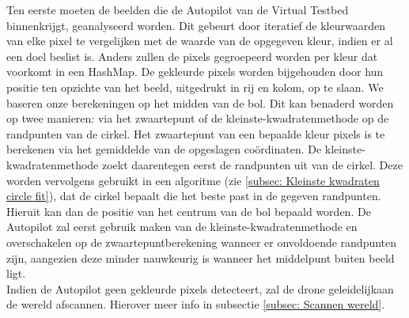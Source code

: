 \noindent
Ten eerste moeten de beelden die de Autopilot van de Virtual Testbed binnenkrijgt, geanalyseerd worden. Dit gebeurt door iteratief de kleurwaarden van elke pixel te vergelijken met de waarde van de opgegeven kleur, indien er al een doel beslist is. Anders zullen de pixels gegroepeerd worden per kleur dat voorkomt in een HashMap. De gekleurde pixels worden bijgehouden door hun positie ten opzichte van het beeld, uitgedrukt in rij en kolom, op te slaan. We baseren onze berekeningen op het midden van de bol. Dit kan benaderd worden op twee manieren: via het zwaartepunt of de kleinste-kwadratenmethode op de randpunten van de cirkel. Het zwaartepunt van een bepaalde kleur pixels is te berekenen via het gemiddelde van de opgeslagen co\"ordinaten. De kleinste-kwadratenmethode zoekt daarentegen eerst de randpunten uit van de cirkel. Deze worden vervolgens gebruikt in een algoritme (zie \ref{subsec: Kleinste kwadraten circle fit}), dat de cirkel bepaalt die het beste past in de gegeven randpunten. Hieruit kan dan de positie van het centrum van de bol bepaald worden. De Autopilot zal eerst gebruik maken van de kleinste-kwadratenmethode en overschakelen op de zwaartepuntberekening wanneer er onvoldoende randpunten zijn, aangezien deze minder nauwkeurig is wanneer het middelpunt buiten beeld ligt.
\\
Indien de Autopilot geen gekleurde pixels detecteert, zal de drone geleidelijkaan de wereld afscannen. Hierover meer info in subsectie \ref{subsec: Scannen wereld}.